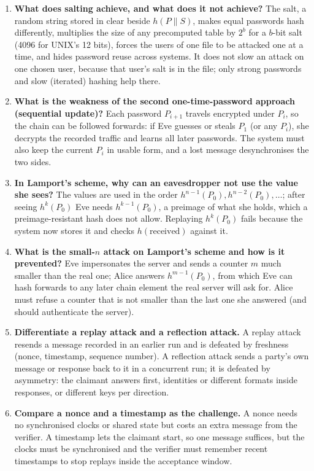 \begin{enumerate}[leftmargin=1.6em,itemsep=3pt]
  \item \textbf{What does salting achieve, and what does it not achieve?} The salt, a random string stored in clear beside $h(P \| S)$, makes equal passwords hash differently, multiplies the size of any precomputed table by $2^b$ for a $b$-bit salt (4096 for UNIX's 12 bits), forces the users of one file to be attacked one at a time, and hides password reuse across systems. It does not slow an attack on one chosen user, because that user's salt is in the file; only strong passwords and slow (iterated) hashing help there.
  \item \textbf{What is the weakness of the second one-time-password approach (sequential update)?} Each password $P_{i+1}$ travels encrypted under $P_i$, so the chain can be followed forwards: if Eve guesses or steals $P_1$ (or any $P_i$), she decrypts the recorded traffic and learns all later passwords. The system must also keep the current $P_i$ in usable form, and a lost message desynchronises the two sides.
  \item \textbf{In Lamport's scheme, why can an eavesdropper not use the value she sees?} The values are used in the order $h^{n-1}(P_0), h^{n-2}(P_0), \dots$; after seeing $h^k(P_0)$ Eve needs $h^{k-1}(P_0)$, a preimage of what she holds, which a preimage-resistant hash does not allow. Replaying $h^k(P_0)$ fails because the system now stores it and checks $h(\text{received})$ against it.
  \item \textbf{What is the small-$n$ attack on Lamport's scheme and how is it prevented?} Eve impersonates the server and sends a counter $m$ much smaller than the real one; Alice answers $h^{m-1}(P_0)$, from which Eve can hash forwards to any later chain element the real server will ask for. Alice must refuse a counter that is not smaller than the last one she answered (and should authenticate the server).
  \item \textbf{Differentiate a replay attack and a reflection attack.} A replay attack resends a message recorded in an earlier run and is defeated by freshness (nonce, timestamp, sequence number). A reflection attack sends a party's own message or response back to it in a concurrent run; it is defeated by asymmetry: the claimant answers first, identities or different formats inside responses, or different keys per direction.
  \item \textbf{Compare a nonce and a timestamp as the challenge.} A nonce needs no synchronised clocks or shared state but costs an extra message from the verifier. A timestamp lets the claimant start, so one message suffices, but the clocks must be synchronised and the verifier must remember recent timestamps to stop replays inside the acceptance window.

\end{enumerate}
